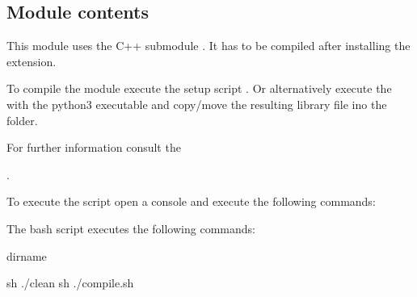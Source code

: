 \documentclass[a4paper,10pt,english]{sphinxmanual}
\begin{document}
\subsection{Module contents}
\label{\detokenize{drc/drc:module-kppc.drc}}\label{\detokenize{drc/drc:module-contents}}
This module uses the C++ submodule {\hyperref[\detokenize{drc/drc:slcleaner}]{}}. It has to be compiled after installing the
extension.

To compile the module execute the setup script .
Or alternatively execute the  with the python3 executable
and copy/move the resulting  library file ino the  folder.

For further information consult the %
\begin{footnote}[5]\sphinxAtStartFootnote
{}
%
\end{footnote}.

To execute the script open a console and execute the following commands:

\begin{sphinxVerbatim}[commandchars=\\\{\}]
\end{sphinxVerbatim}

The bash script executes the following commands:

\begin{sphinxVerbatim}[commandchars=\\\{\}]


 dirname 

sh ./clean
sh ./compile.sh
\end{sphinxVerbatim}
\end{document}
